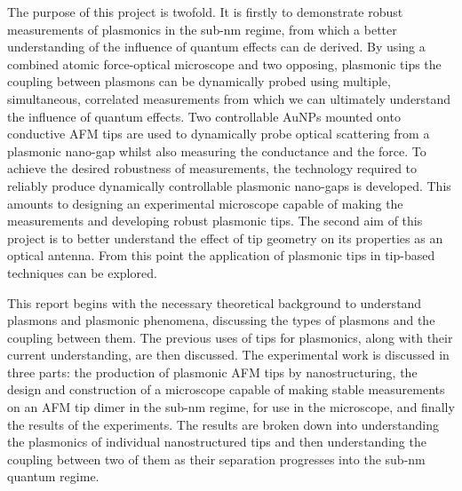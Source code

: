 \documentclass[12pt, a4paper, twoside]{book}
\begin{document}
The purpose of this project is twofold. It is firstly to demonstrate robust measurements of plasmonics in the sub-nm regime, from which a better understanding of the influence of quantum effects can de derived. By using a combined atomic force-optical microscope and two opposing, plasmonic tips the coupling between plasmons can be dynamically probed using multiple, simultaneous, correlated measurements from which we can ultimately understand the influence of quantum effects.
Two controllable AuNPs mounted onto conductive AFM tips are used to dynamically probe optical scattering from a plasmonic nano-gap whilst also measuring the conductance and the force. To achieve the desired robustness of measurements, the technology required to reliably produce dynamically controllable plasmonic nano-gaps is developed. This amounts to designing an experimental microscope capable of making the measurements and developing robust plasmonic tips.
The second aim of this project is to better understand the effect of tip geometry on its properties as an optical antenna. From this point the application of plasmonic tips in tip-based techniques can be explored.

This report begins with the necessary theoretical background to understand plasmons and plasmonic phenomena, discussing the types of plasmons and the coupling between them. The previous uses of tips for plasmonics, along with their current understanding, are then discussed. The experimental work is discussed in three parts: the production of plasmonic AFM tips by nanostructuring, the design and construction of a microscope capable of making stable measurements on an AFM tip dimer in the sub-nm regime, for use in the microscope, and finally the results of the experiments. The results are broken down into understanding the plasmonics of individual nanostructured tips and then understanding the coupling between two of them as their separation progresses into the sub-nm quantum regime.
\end{document}
